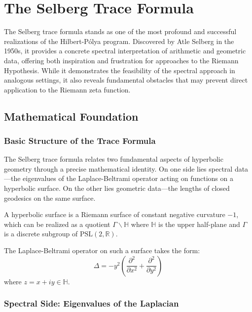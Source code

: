 \chapter{The Selberg Trace Formula}
\label{ch:selberg_trace}

The Selberg trace formula stands as one of the most profound and successful realizations of the Hilbert-Pólya program. Discovered by Atle Selberg in the 1950s, it provides a concrete spectral interpretation of arithmetic and geometric data, offering both inspiration and frustration for approaches to the Riemann Hypothesis. While it demonstrates the feasibility of the spectral approach in analogous settings, it also reveals fundamental obstacles that may prevent direct application to the Riemann zeta function.

\section{Mathematical Foundation}
\label{sec:mathematical_foundation}

\subsection{Basic Structure of the Trace Formula}

The Selberg trace formula relates two fundamental aspects of hyperbolic geometry through a precise mathematical identity. On one side lies spectral data—the eigenvalues of the Laplace-Beltrami operator acting on functions on a hyperbolic surface. On the other lies geometric data—the lengths of closed geodesics on the same surface.

\begin{definition}
\label{def:hyperbolic_surface}
A hyperbolic surface is a Riemann surface of constant negative curvature $-1$, which can be realized as a quotient $\Gamma \backslash \mathbb{H}$ where $\mathbb{H}$ is the upper half-plane and $\Gamma$ is a discrete subgroup of $\mathrm{PSL}(2,\mathbb{R})$.
\end{definition}

The Laplace-Beltrami operator on such a surface takes the form:
$$\Delta = -y^2 \left( \frac{\partial^2}{\partial x^2} + \frac{\partial^2}{\partial y^2} \right)$$
where $z = x + iy \in \mathbb{H}$.

\subsection{Spectral Side: Eigenvalues of the Laplacian}

